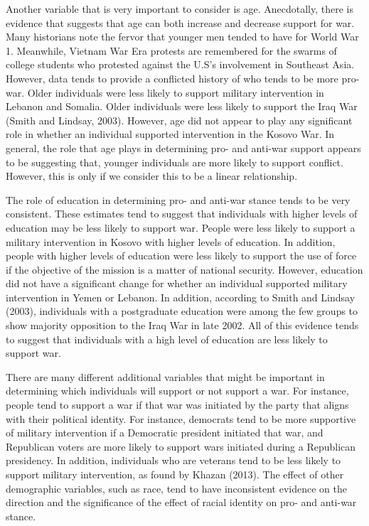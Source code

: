 \documentclass[
  11pt,
]{article}
\begin{document}
Another variable that is very important to consider is age. Anecdotally,
there is evidence that suggests that age can both increase and decrease
support for war. Many historians note the fervor that younger men tended
to have for World War 1. Meanwhile, Vietnam War Era protests are
remembered for the swarms of college students who protested against the
U.S's involvement in Southeast Asia. However, data tends to provide a
conflicted history of who tends to be more pro-war. Older individuals
were less likely to support military intervention in Lebanon and
Somalia. Older individuals were less likely to support the Iraq War
(Smith and Lindsay, 2003). However, age did not appear to play any
significant role in whether an individual supported intervention in the
Kosovo War. In general, the role that age plays in determining pro- and
anti-war support appears to be suggesting that, younger individuals are
more likely to support conflict. However, this is only if we consider
this to be a linear relationship.

The role of education in determining pro- and anti-war stance tends to
be very consistent. These estimates tend to suggest that individuals
with higher levels of education may be less likely to support war.
People were less likely to support a military intervention in Kosovo
with higher levels of education. In addition, people with higher levels
of education were less likely to support the use of force if the
objective of the mission is a matter of national security. However,
education did not have a significant change for whether an individual
supported military intervention in Yemen or Lebanon. In addition,
according to Smith and Lindsay (2003), individuals with a postgraduate
education were among the few groups to show majority opposition to the
Iraq War in late 2002. All of this evidence tends to suggest that
individuals with a high level of education are less likely to support
war.

There are many different additional variables that might be important in
determining which individuals will support or not support a war. For
instance, people tend to support a war if that war was initiated by the
party that aligns with their political identity. For instance, democrats
tend to be more supportive of military intervention if a Democratic
president initiated that war, and Republican voters are more likely to
support wars initiated during a Republican presidency. In addition,
individuals who are veterans tend to be less likely to support military
intervention, as found by Khazan (2013). The effect of other demographic
variables, such as race, tend to have inconsistent evidence on the
direction and the significance of the effect of racial identity on pro-
and anti-war stance.
\end{document}
